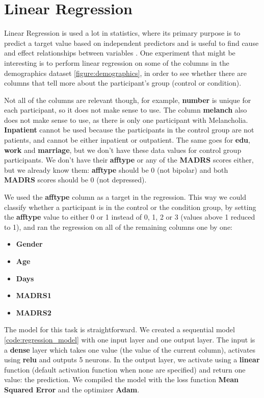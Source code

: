 \section{Linear Regression}

Linear Regression is used a lot in statistics, where its primary purpose is to predict a target value based on independent predictors and is useful to find cause and effect relationships between variables \cite{linear_regression}. One experiment that might be interesting is to perform linear regression on some of the columns in the demographics dataset \ref{figure:demographics}, in order to see whether there are columns that tell more about the participant's group (control or condition).  

Not all of the columns are relevant though, for example, \textbf{number} is unique for each participant, so it does not make sense to use. The column \textbf{melanch} also does not make sense to use, as there is only one participant with Melancholia. \textbf{Inpatient} cannot be used because the participants in the control group are not patients, and cannot be either inpatient or outpatient. The same goes for \textbf{edu}, \textbf{work} and \textbf{marriage}, but we don't have these data values for control group participants. We don't have their \textbf{afftype} or any of the \textbf{MADRS} scores either, but we already know them: \textbf{afftype} should be 0 (not bipolar) and both \textbf{MADRS} scores should be 0 (not depressed). 

We used the \textbf{afftype} column as a target in the regression. This way we could classify whether a participant is in the control or the condition group, by setting the \textbf{afftype} value to either 0 or 1 instead of 0, 1, 2 or 3 (values above 1 reduced to 1), and ran the regression on all of the remaining columns one by one:

\begin{itemize}
      \item \textbf{Gender}
      \item \textbf{Age}
      \item \textbf{Days}
      \item \textbf{MADRS1}
      \item \textbf{MADRS2}
\end{itemize}



The model for this task is straightforward. We created a sequential model \ref{code:regression_model} with one input layer and one output layer. The input is a \textbf{dense} layer which takes one value (the value of the current column), activates using \textbf{relu} and outputs 5 neurons. In the output layer, we activate using a \textbf{linear} function (default activation function when none are specified) and return one value: the prediction. We compiled the model with the loss function \textbf{Mean Squared Error} and the optimizer \textbf{Adam}. 

